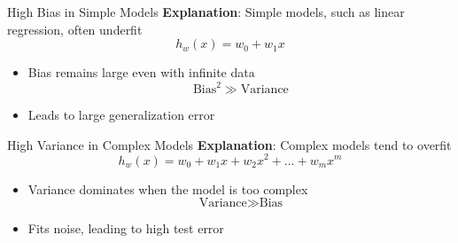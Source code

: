 \documentclass[serif, aspectratio=169]{beamer}
\begin{document}
    \begin{frame}{High Bias in Simple Models}
        \textbf{Explanation}: Simple models, such as linear regression, often underfit
        \[
            h_w(x) = w_0 + w_1 x
        \]
        \begin{itemize}
            \item Bias remains large even with infinite data
            \[
                \text{Bias}^2 \gg \text{Variance}
            \]
            \item Leads to large generalization error
        \end{itemize}
    \end{frame}

    \begin{frame}{High Variance in Complex Models}
        \textbf{Explanation}: Complex models tend to overfit
        \[
            h_w(x) = w_0 + w_1 x + w_2 x^2 + \dots + w_m x^m
        \]
        \begin{itemize}
            \item Variance dominates when the model is too complex
            \[
                \text{Variance} \gg \text{Bias}
            \]
            \item Fits noise, leading to high test error
        \end{itemize}
    \end{frame}
\end{document}
